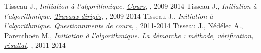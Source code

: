 \documentclass[11pt,a4paper,colorlinks,breaklinks]{article}
\begin{document}
\newpage
\begin{thebibliography}{99}\label{annexe:biblio}
 Tisseau J., \emph{Initiation à l'algorithmique. \href{http://www.enib.fr/~tisseau/pdf/course/info-S1.pdf}{Cours}}, \enib, 2009-2014
 Tisseau J., \emph{Initiation à l'algorithmique. \href{http://www.enib.fr/~tisseau/pdf/course/td-info-S1.pdf}{Travaux dirigés}}, \enib, 2009-2014
 Tisseau J., \emph{Initiation à l'algorithmique. \href{http://www.enib.fr/~tisseau/pdf/course/q-info-S1.pdf}{Questionnments de cours}}, \enib, 2011-2014
 Tisseau J., Nédélec A., Parenthoën M., \emph{Initiation à l'algorithmique. \href{http://www.enib.fr/~tisseau/pdf/course/mvr-paper.pdf}{La démarche \mvr : méthode, vérification, résultat}}, \enib, 2011-2014
\end{thebibliography}

\label{fin}
\end{document}
